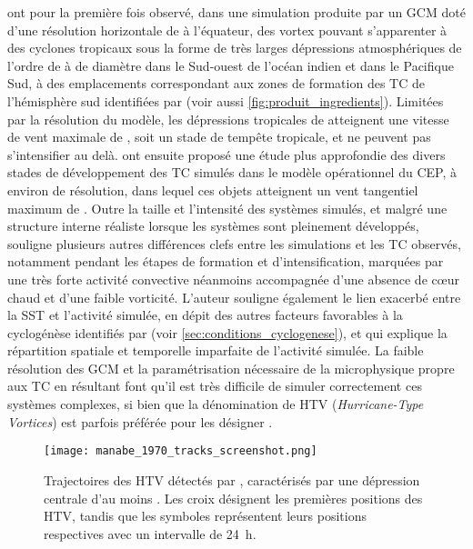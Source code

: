 \documentclass[../main.tex]{subfiles}
\begin{document}
\cite{manabe_tropical_1970} ont pour la première fois observé, dans une simulation produite par un GCM doté d'une résolution horizontale de  à
l'équateur, des vortex pouvant s'apparenter à des cyclones tropicaux sous la forme de très larges dépressions atmosphériques de l'ordre de  à 
de diamètre dans le Sud-ouest de l'océan indien et dans le Pacifique Sud, à des emplacements correspondant aux zones de formation des TC de l'hémisphère sud
identifiées par \cite{gray_global_1968} (voir aussi \cref{fig:produit_ingredients}). Limitées par la résolution du modèle, les dépressions tropicales de
\cite{manabe_tropical_1970} atteignent une vitesse de vent maximale de , soit un stade de tempête tropicale, et ne peuvent pas s'intensifier au delà.
\cite{bengtsson_simulation_1982} ont ensuite proposé une étude plus approfondie des divers stades de développement des TC simulés dans le modèle opérationnel du
CEP, à environ  de résolution, dans lequel ces objets atteignent un vent tangentiel maximum de . Outre la taille et l'intensité des systèmes
simulés, et malgré une structure interne réaliste lorsque les systèmes sont pleinement développés, \cite{mcbride_comments_1984} souligne plusieurs autres
différences clefs entre les simulations et les TC observés, notamment pendant les étapes de formation et d'intensification, marquées par une très forte activité
convective néanmoins accompagnée d'une absence de cœur chaud et d'une faible vorticité. L'auteur souligne également le lien exacerbé entre la SST et l'activité
simulée, en dépit des autres facteurs favorables à la cyclogénèse identifiés par \cite{gray_tropical_1975} (voir \cref{sec:conditions_cyclogenese}), et
qui explique la répartition spatiale et temporelle imparfaite de l'activité simulée. La faible résolution des GCM et la paramétrisation nécessaire de la
microphysique propre aux TC en résultant font qu'il est très difficile de simuler correctement ces systèmes complexes, si bien que la dénomination de HTV
(\textit{Hurricane-Type Vortices}) est parfois préférée pour les désigner
\parencite{bengtsson_simulation_1982,bengtsson_hurricanetype_1995,chauvin_response_2006}.

\begin{figure}[htbp]
    \centering
    \texttt{[image: manabe\_1970\_tracks\_screenshot.png]}
    \caption{Trajectoires des HTV détectés par \cite{manabe_tropical_1970}, caractérisés par une dépression centrale d'au moins . Les croix désignent les
        premières positions des HTV, tandis que les symboles représentent leurs positions respectives avec un intervalle de \SI{24}{\hour}.}
    \label{fig:tracks_manabe}
\end{figure}
\end{document}

